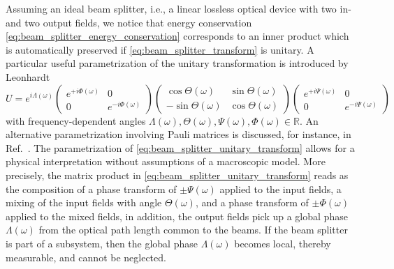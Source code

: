 Assuming an ideal beam splitter, i.e., a linear lossless optical device with two in- and two output fields, we notice that energy conservation \cref{eq:beam_splitter_energy_conservation} corresponds to an inner product which is automatically preserved if \cref{eq:beam_splitter_transform} is unitary.
A particular useful parametrization of the unitary transformation is introduced by Leonhardt~\cite[p.~92]{Leonhardt2010}
\begin{equation}
	U
	=
    e^{i\Lambda(\omega)}
    \begin{pmatrix}
        e^{+i\Phi(\omega)} & 0
        \\
        0 & e^{-i\Phi(\omega)}
    \end{pmatrix}
    \begin{pmatrix}
        \cos\Theta(\omega) & \sin\Theta(\omega)
        \\
        -\sin\Theta(\omega) & \cos\Theta(\omega)
    \end{pmatrix}
    \begin{pmatrix}
        e^{+i\Psi(\omega)} & 0
        \\
        0 & e^{-i\Psi(\omega)}
    \end{pmatrix}
    \label{eq:beam_splitter_unitary_transform}
\end{equation}
with frequency-dependent angles $\Lambda(\omega),\Theta(\omega),\Psi(\omega),\Phi(\omega)\in\mathbb{R}$.
An alternative parametrization involving Pauli matrices is discussed, for instance, in Ref.~\cite{Zeilinger1981}.
The parametrization of \cref{eq:beam_splitter_unitary_transform} allows for a physical interpretation without assumptions of a macroscopic model.
More precisely, the matrix product in \cref{eq:beam_splitter_unitary_transform} reads as the composition of a phase transform of $\pm\Psi(\omega)$ applied to the input fields, a mixing of the input fields with angle $\Theta(\omega)$, and a phase transform of $\pm\Phi(\omega)$ applied to the mixed fields, in addition, the output fields pick up a global phase $\Lambda(\omega)$ from the optical path length common to the beams.
If the beam splitter is part of a subsystem, then the global phase $\Lambda(\omega)$ becomes local, thereby measurable, and cannot be neglected.

